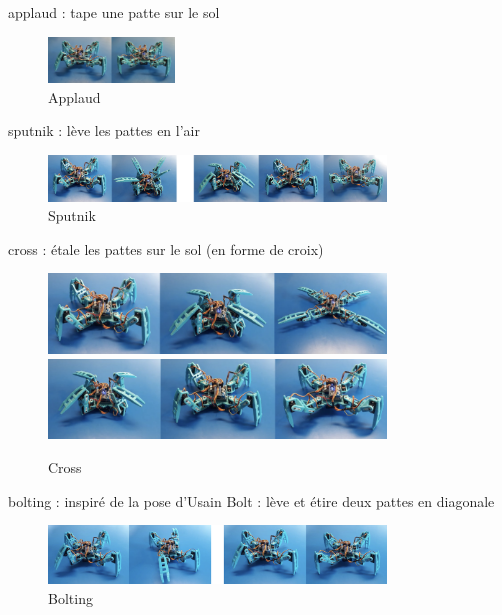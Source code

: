 applaud : tape une patte sur le sol

\begin{figure}
	\begin{center}
		\includegraphics[width=0.3\textwidth]{./img/applaud}
		\caption{Applaud}
	\end{center}
\end{figure}

sputnik : lève les pattes en l'air

\begin{figure}
	\begin{center}
		\includegraphics[width=0.8\textwidth]{./img/sputnik}
		\caption{Sputnik}
	\end{center}
\end{figure}

cross : étale les pattes sur le sol (en forme de croix)

\begin{figure}
	\begin{center}
		\includegraphics[width=0.8\textwidth]{./img/cross_1}
		\includegraphics[width=0.8\textwidth]{./img/cross_2}
		\caption{Cross}
	\end{center}
\end{figure}

bolting : inspiré de la pose d'Usain Bolt : lève et étire deux pattes en diagonale

\begin{figure}
	\begin{center}
		\includegraphics[width=0.8\textwidth]{./img/bolting}
		\caption{Bolting}
	\end{center}
\end{figure}

